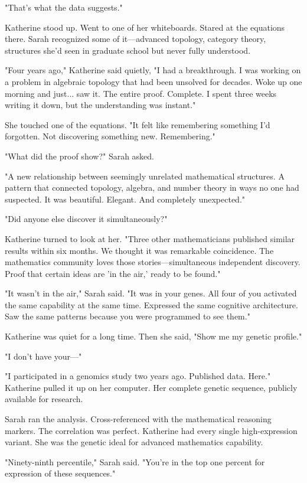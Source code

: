"That's what the data suggests."

Katherine stood up. Went to one of her whiteboards. Stared at the equations there. Sarah recognized some of it—advanced topology, category theory, structures she'd seen in graduate school but never fully understood.

"Four years ago," Katherine said quietly, "I had a breakthrough. I was working on a problem in algebraic topology that had been unsolved for decades. Woke up one morning and just... saw it. The entire proof. Complete. I spent three weeks writing it down, but the understanding was instant."

She touched one of the equations. "It felt like remembering something I'd forgotten. Not discovering something new. Remembering."

"What did the proof show?" Sarah asked.

"A new relationship between seemingly unrelated mathematical structures. A pattern that connected topology, algebra, and number theory in ways no one had suspected. It was beautiful. Elegant. And completely unexpected."

"Did anyone else discover it simultaneously?"

Katherine turned to look at her. "Three other mathematicians published similar results within six months. We thought it was remarkable coincidence. The mathematics community loves those stories—simultaneous independent discovery. Proof that certain ideas are 'in the air,' ready to be found."

"It wasn't in the air," Sarah said. "It was in your genes. All four of you activated the same capability at the same time. Expressed the same cognitive architecture. Saw the same patterns because you were programmed to see them."

Katherine was quiet for a long time. Then she said, "Show me my genetic profile."

"I don't have your—"

"I participated in a genomics study two years ago. Published data. Here." Katherine pulled it up on her computer. Her complete genetic sequence, publicly available for research.

Sarah ran the analysis. Cross-referenced with the mathematical reasoning markers. The correlation was perfect. Katherine had every single high-expression variant. She was the genetic ideal for advanced mathematics capability.

"Ninety-ninth percentile," Sarah said. "You're in the top one percent for expression of these sequences."

